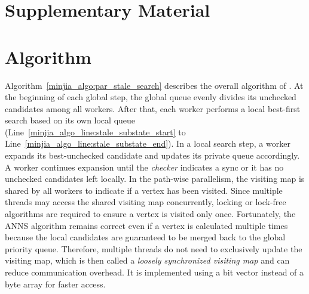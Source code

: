 
\clearpage
\nobalance
\section*{Supplementary Material}
\appendix

\section{\Hammer Algorithm} 




Algorithm~\ref{minjia_algo:par_stale_search} describes the overall algorithm of \Hammer. At the beginning of each global step, the global queue evenly divides its unchecked candidates among all workers.
After that, each worker performs a local best-first search based on its own local queue (Line~\ref{minjia_algo_line:stale_substate_start} to Line~\ref{minjia_algo_line:stale_substate_end}).
In a local search step, a worker expands its best-unchecked candidate and updates its private queue accordingly.
A worker continues expansion until the \emph{checker} indicates a sync
or it has no unchecked candidates left locally. 
In the path-wise parallelism, the visiting map is shared by all workers to indicate if a vertex has been visited.
Since multiple threads may access the shared visiting map concurrently, locking or lock-free algorithms are required to ensure a vertex is visited only once. 
Fortunately, the ANNS algorithm remains correct even if a vertex is calculated multiple times because the local candidates are guaranteed to be merged back to the global priority queue.
Therefore, multiple threads do not need to exclusively update the visiting map, which is then called a \emph{loosely synchronized visiting map} and can reduce communication overhead.
It is implemented using a bit vector instead of a byte array for faster access.


